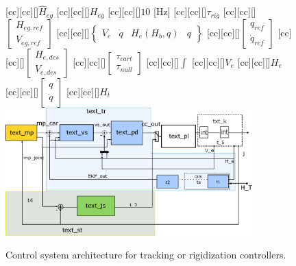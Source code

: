 \begin{figure}
[cc][cc][\FontFigS]{\small{$\hat{H}_{eg}$}}
[cc][cc][\FontFigS]{\small{$H_{eg}$}}
[cc][cc][\FontFigS]{\small{$10$ [Hz]}}
[cc][cc][\FontFigS]{\small{$\tau_{rig}$}}
[cc][cc][\FontFigS]{\small{$\begin{bmatrix}H_{eg,ref}\\ V_{eg,ref}\end{bmatrix}$}}
[cc][cc][\FontFigS]{\small{$\begin{Bmatrix}V_{e} & \dot{q} & H_{e}(H_b, q) & q\end{Bmatrix}$}}
[cc][cc][\FontFigS]{\small{$\begin{bmatrix}q_{ref}\\ \dot{q}_{ref}\end{bmatrix}$}}
[cc][cc][\FontFigS]{\small{$\begin{bmatrix}H_{e,des}\\ V_{e,des}\end{bmatrix}$}}
[cc][cc][\FontFigS]{\small{$\begin{bmatrix}\tau_{cart}\\ \tau_{null}\end{bmatrix}$}}
[cc][cc][\FontFigS]{$\int$}
[cc][cc][\FontFigS]{\small{$V_e$}}
[cc][cc][\FontFigS]{\small{$H_e$}}
[cc][cc][\FontFigS]{\small{$\begin{bmatrix}q\\ \dot{q}\end{bmatrix}$}}
[cc][cc][\FontFigS]{\small{$H_t$}}
\centering\includegraphics[angle=0,width=0.85\textwidth]{./figures/BlockDia11}
\caption{Control system architecture for tracking or rigidization controllers.}
\label{fig:blockdiagram}
\end{figure}
%
